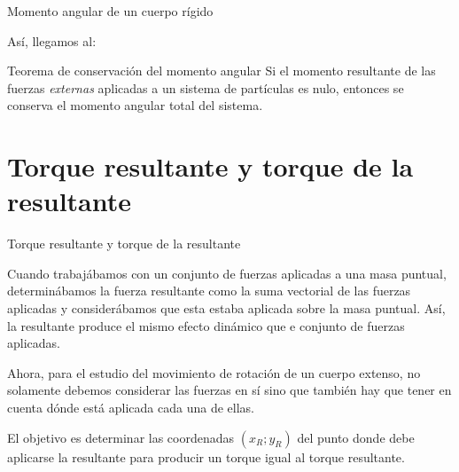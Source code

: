 \documentclass[11pt,handout,aspectratio=1610]{beamer}
\newcommand{\vs}{\vspace{11pt}}
\begin{document}
\begin{frame}{Momento angular de un cuerpo rígido}

    Así, llegamos al:
    \begin{block}{Teorema de conservación del momento angular}
        Si el momento resultante de las fuerzas \emph{externas} aplicadas a un sistema de partículas es nulo, entonces se conserva el momento angular total del sistema.
    \end{block}

\end{frame}

\section{Torque resultante y torque de la resultante}

\begin{frame}{Torque resultante y torque de la resultante}

    Cuando trabajábamos con un conjunto de fuerzas aplicadas a una masa puntual, determinábamos la fuerza resultante como la suma vectorial de las fuerzas aplicadas y considerábamos que esta estaba aplicada sobre la masa puntual. Así, la resultante produce el mismo efecto dinámico que e conjunto de fuerzas aplicadas. 
    
    \vs
    
    Ahora, para el estudio del movimiento de rotación de un cuerpo extenso, no solamente debemos considerar las fuerzas en sí sino que también hay que tener en cuenta dónde está aplicada cada una de ellas.

    \vs 

    El objetivo es determinar las coordenadas $\left(x_R; y_R\right)$ del punto donde debe aplicarse la resultante para producir un torque igual al torque resultante.
    
\end{frame}
\end{document}

